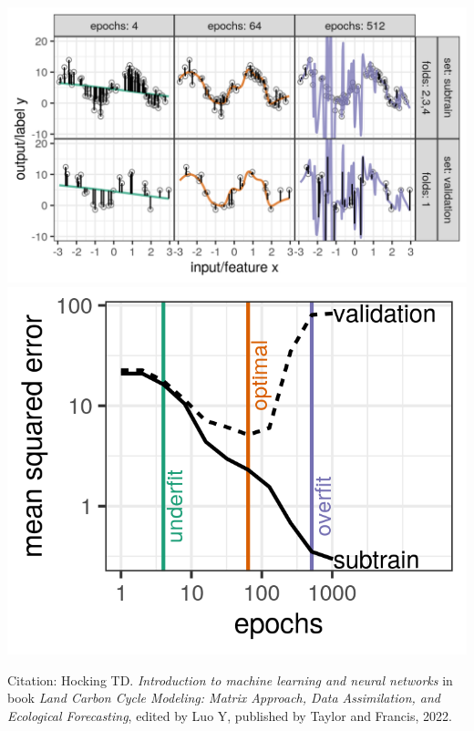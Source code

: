 \documentclass{beamer}
\begin{document}
\begin{frame}
  \centering
  \includegraphics[height=0.5\textheight]{figure-overfitting-paper}
  \includegraphics[height=0.35\textheight]{figure-overfitting-paper-loss}   

\scriptsize  Citation: Hocking TD. \emph{Introduction to machine learning and
  neural networks} in book \emph{Land Carbon Cycle Modeling: Matrix
  Approach, Data Assimilation, and Ecological Forecasting}, edited by
  Luo Y, published by Taylor and Francis, 2022.
\end{frame} 
\end{document}
